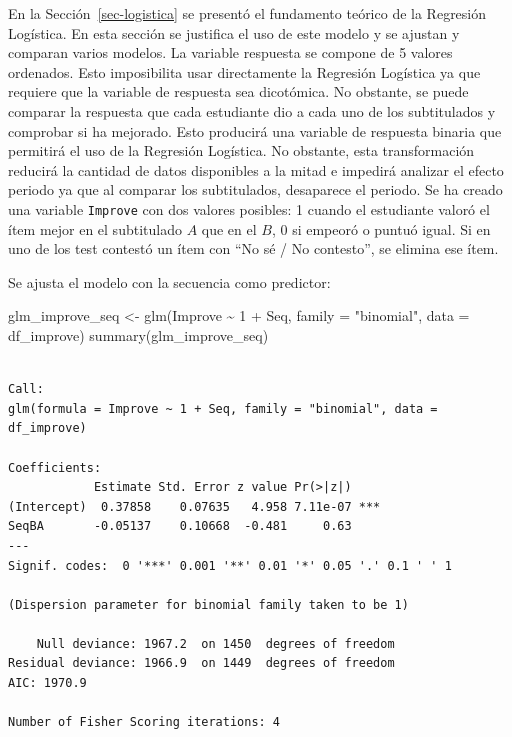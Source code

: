 \documentclass[
  12pt,
  a4paper,
  extrafontsizes,
  onecolumn,
  openright,
  table]{memoir}
\newenvironment{Shaded}{\begin{snugshade}}{\end{snugshade}}
\newcommand{\AttributeTok}[1]{\textcolor[rgb]{0.40,0.45,0.13}{#1}}
\newcommand{\DecValTok}[1]{\textcolor[rgb]{0.68,0.00,0.00}{#1}}
\newcommand{\FunctionTok}[1]{\textcolor[rgb]{0.28,0.35,0.67}{#1}}
\newcommand{\NormalTok}[1]{\textcolor[rgb]{0.00,0.23,0.31}{#1}}
\newcommand{\OtherTok}[1]{\textcolor[rgb]{0.00,0.23,0.31}{#1}}
\newcommand{\SpecialCharTok}[1]{\textcolor[rgb]{0.37,0.37,0.37}{#1}}
\newcommand{\StringTok}[1]{\textcolor[rgb]{0.13,0.47,0.30}{#1}}
\begin{document}
En la Sección~\ref{sec-logistica} se presentó el fundamento teórico de
la \gls{Regresión Logística}. En esta sección se justifica el uso de
este modelo y se ajustan y comparan varios modelos. La variable
respuesta se compone de 5 valores ordenados. Esto imposibilita usar
directamente la Regresión Logística ya que requiere que la variable de
respuesta sea dicotómica. No obstante, se puede comparar la respuesta
que cada estudiante dio a cada uno de los subtitulados y comprobar si ha
mejorado. Esto producirá una variable de respuesta binaria que permitirá
el uso de la Regresión Logística. No obstante, esta transformación
reducirá la cantidad de datos disponibles a la mitad e impedirá analizar
el \gls{efecto periodo} ya que al comparar los subtitulados, desaparece
el periodo. Se ha creado una variable \texttt{Improve} con dos valores
posibles: 1 cuando el estudiante valoró el ítem mejor en el subtitulado
\(A\) que en el \(B\), 0 si empeoró o puntuó igual. Si en uno de los
test contestó un ítem con \enquote{No sé / No contesto}, se elimina ese
ítem.

Se ajusta el modelo con la secuencia como predictor:

\scriptsize

\begin{Shaded}
\begin{Highlighting}[]
\NormalTok{glm\_improve\_seq }\OtherTok{\textless{}{-}} \FunctionTok{glm}\NormalTok{(Improve }\SpecialCharTok{\textasciitilde{}} \DecValTok{1} \SpecialCharTok{+}\NormalTok{ Seq, }\AttributeTok{family =} \StringTok{"binomial"}\NormalTok{, }\AttributeTok{data =}\NormalTok{ df\_improve)}
\FunctionTok{summary}\NormalTok{(glm\_improve\_seq)}
\end{Highlighting}
\end{Shaded}

\begin{verbatim}

Call:
glm(formula = Improve ~ 1 + Seq, family = "binomial", data = df_improve)

Coefficients:
            Estimate Std. Error z value Pr(>|z|)    
(Intercept)  0.37858    0.07635   4.958 7.11e-07 ***
SeqBA       -0.05137    0.10668  -0.481     0.63    
---
Signif. codes:  0 '***' 0.001 '**' 0.01 '*' 0.05 '.' 0.1 ' ' 1

(Dispersion parameter for binomial family taken to be 1)

    Null deviance: 1967.2  on 1450  degrees of freedom
Residual deviance: 1966.9  on 1449  degrees of freedom
AIC: 1970.9

Number of Fisher Scoring iterations: 4
\end{verbatim}
\end{document}
